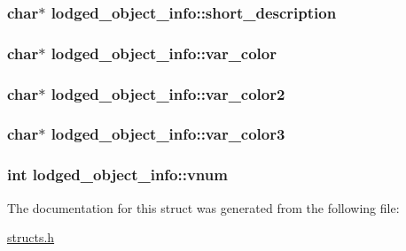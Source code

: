 \hypertarget{structlodged__object__info_aacc602b89467eb3113207959551d867c}{
\subsubsection[{short\-\_\-description}]{\setlength{\rightskip}{0pt plus 5cm}char$\ast$ lodged\-\_\-object\-\_\-info\-::short\-\_\-description}}\label{structlodged__object__info_aacc602b89467eb3113207959551d867c}
\hypertarget{structlodged__object__info_a500dde882cb024dad05652e6a74b504b}{
\subsubsection[{var\-\_\-color}]{\setlength{\rightskip}{0pt plus 5cm}char$\ast$ lodged\-\_\-object\-\_\-info\-::var\-\_\-color}}\label{structlodged__object__info_a500dde882cb024dad05652e6a74b504b}
\hypertarget{structlodged__object__info_af8fad921ce3dd7335ff8c290d8799621}{
\subsubsection[{var\-\_\-color2}]{\setlength{\rightskip}{0pt plus 5cm}char$\ast$ lodged\-\_\-object\-\_\-info\-::var\-\_\-color2}}\label{structlodged__object__info_af8fad921ce3dd7335ff8c290d8799621}
\hypertarget{structlodged__object__info_a7202f04109e336635884bf89a8826b60}{
\subsubsection[{var\-\_\-color3}]{\setlength{\rightskip}{0pt plus 5cm}char$\ast$ lodged\-\_\-object\-\_\-info\-::var\-\_\-color3}}\label{structlodged__object__info_a7202f04109e336635884bf89a8826b60}
\hypertarget{structlodged__object__info_a92eba40298d079eabeba79108fa760c6}{
\subsubsection[{vnum}]{\setlength{\rightskip}{0pt plus 5cm}int lodged\-\_\-object\-\_\-info\-::vnum}}\label{structlodged__object__info_a92eba40298d079eabeba79108fa760c6}


The documentation for this struct was generated from the following file\-:\begin{DoxyCompactItemize}
\item 
\hyperlink{structs_8h}{structs.\-h}\end{DoxyCompactItemize}
